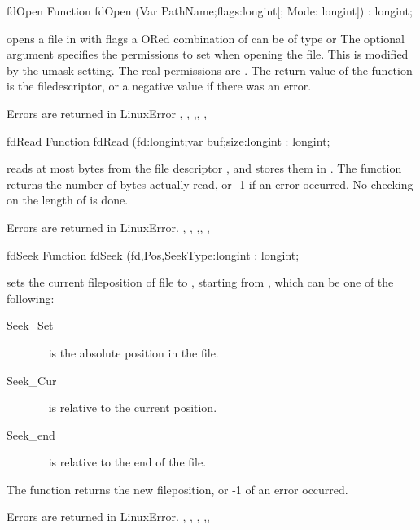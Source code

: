 \begin{function}{fdOpen}
\Declaration
Function fdOpen (Var PathName;flags:longint[; Mode: longint]) : longint;

\Description
  opens a file in  with flags  a ORed combination of
    can be of type  or
  The optional  argument specifies the permissions to set when opening
  the file. This is modified by the umask setting. The real permissions are
  .
  The return value of the function is the filedescriptor, or a negative 
  value if there was an error.

\Errors
Errors are returned in LinuxError
\SeeAlso
{}, , ,,
, 
\end{function}
\html{}
\begin{function}{fdRead}
\Declaration
Function fdRead (fd:longint;var buf;size:longint : longint;

\Description
  reads at most  bytes from the file descriptor
, and stores them in . 
The function returns the number of bytes actually read, or -1 if
an error occurred.
No checking on the length of  is done.

\Errors
Errors are returned in LinuxError.
\SeeAlso
{}, , ,,
, 
\end{function}
\html{}
\begin{function}{fdSeek}
\Declaration
Function fdSeek (fd,Pos,SeekType:longint : longint;

\Description
{} sets the current fileposition of file  to
, starting from , which can be one of the following:
\begin{description}
\item [Seek\_Set] \  is the absolute position in the file.
\item [Seek\_Cur] \  is relative to the current position.
\item [Seek\_end] \  is relative to the end of the file.
\end{description}
The function returns the new fileposition, or -1 of an error occurred.

\Errors
Errors are returned in LinuxError.
\SeeAlso
{}, , ,
,,
\end{function}
